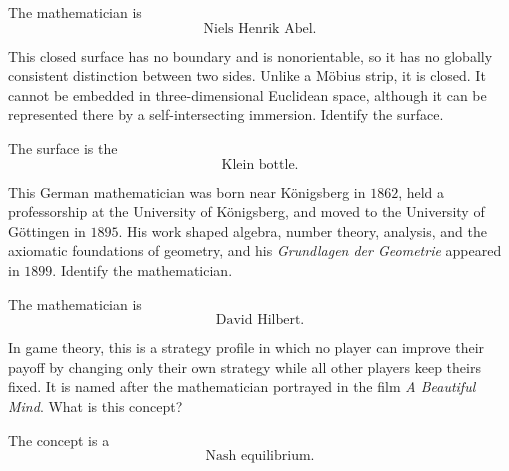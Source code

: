     \begin{solution}
        The mathematician is
        \[
            \boxed{\text{Niels Henrik Abel}}.
        \]
    \end{solution}

    \begin{expectedproblem}
        This closed surface has no boundary and is nonorientable, so it has no
        globally consistent distinction between two sides. Unlike a
        M\"obius strip, it is closed. It cannot be embedded in
        three-dimensional Euclidean space, although it can be represented
        there by a self-intersecting immersion. Identify the surface.
    \end{expectedproblem}

    \begin{solution}
        The surface is the
        \[
            \boxed{\text{Klein bottle}}.
        \]
    \end{solution}

    \begin{expectedproblem}
        This German mathematician was born near K\"onigsberg in $1862$, held a
        professorship at the University of K\"onigsberg, and moved to the
        University of G\"ottingen in $1895$. His work shaped algebra, number
        theory, analysis, and the axiomatic foundations of geometry, and his
        \emph{Grundlagen der Geometrie} appeared in $1899$. Identify the
        mathematician.
    \end{expectedproblem}

    \begin{solution}
        The mathematician is
        \[
            \boxed{\text{David Hilbert}}.
        \]
    \end{solution}

    \begin{expectedproblem}
        In game theory, this is a strategy profile in which no player can
        improve their payoff by changing only their own strategy while all
        other players keep theirs fixed. It is named after the mathematician
        portrayed in the film \emph{A Beautiful Mind}. What is this concept?
    \end{expectedproblem}

    \begin{solution}
        The concept is a
        \[
            \boxed{\text{Nash equilibrium}}.
        \]
    \end{solution}

